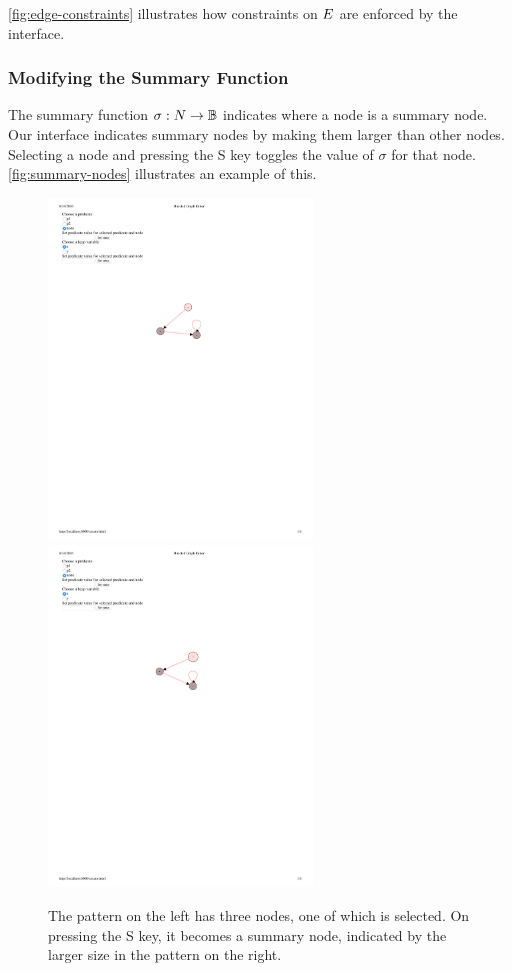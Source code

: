 \autoref{fig:edge-constraints} illustrates how constraints on $E$ are enforced by the interface.

\subsubsection{Modifying the Summary Function}
The summary function $\sigma: N \to \mathbb{B}$ indicates where a node is a summary
node. Our interface indicates summary nodes by making them larger than other nodes.
Selecting a node and pressing the S key toggles the value of $\sigma$ for that node.
\autoref{fig:summary-nodes} illustrates an example of this.

\begin{figure}
  \centering
  \includegraphics[width=7cm]{fig/summary1.pdf}
  \includegraphics[width=7cm]{fig/summary2.pdf}
  \caption{The pattern on the left has three nodes, one of which is selected. On pressing the S key, it becomes a summary node, indicated by the larger size in the pattern on the right.}
  \label{fig:summary-nodes}
\end{figure}

